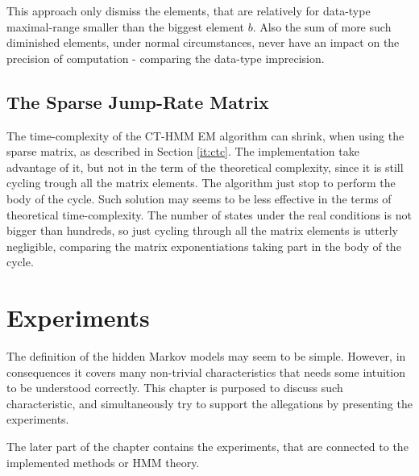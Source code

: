 \documentclass[thesis=M,english]{FITthesis}[2012/10/20]
\begin{document}
This approach only dismiss the elements, that are relatively for data-type maximal-range smaller than the biggest element $b$. Also the sum of more such diminished elements, under normal circumstances, never have an impact on the precision of computation - comparing the data-type imprecision.     


\section{The Sparse Jump-Rate Matrix}

The time-complexity of the CT-HMM EM algorithm can shrink, when using the sparse matrix, as described in Section \ref{it:ctc}. The implementation take advantage of it, but not in the term of the theoretical complexity, since it is still cycling trough all the matrix elements. The algorithm just stop to perform the body of the cycle. Such solution may seems to be less effective in the terms of theoretical time-complexity. The number of states under the real conditions is not bigger than hundreds, so just cycling through all the matrix elements is utterly negligible, comparing the matrix exponentiations taking part in the body of the cycle.  


 
 
\chapter{Experiments}

The definition of the hidden Markov models may seem to be simple. However, in consequences it covers many non-trivial characteristics that needs some intuition to be understood correctly. This chapter is purposed to discuss such characteristic, and simultaneously try to support the allegations by presenting the experiments.

The later part of the chapter contains the experiments, that are connected to the implemented methods or HMM theory. %
\end{document}
